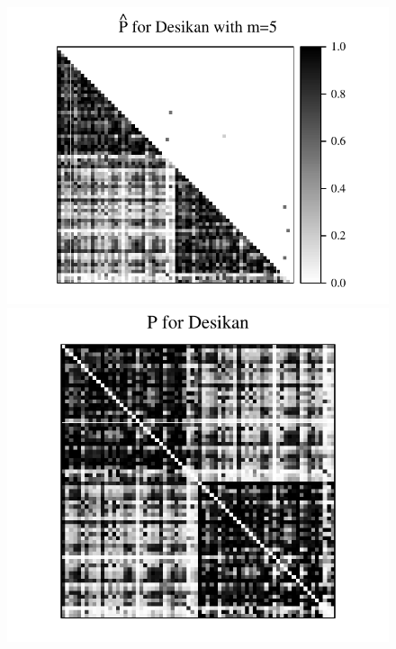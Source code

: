 \begin{figure}[!tbp]
\includegraphics[height=.205\textheight]{./Figures/Phat_desikan_m5.pdf}
\includegraphics[height=.2\textheight]{./Figures/P_desikan.pdf} \hspace{-35pt}

\end{figure}
